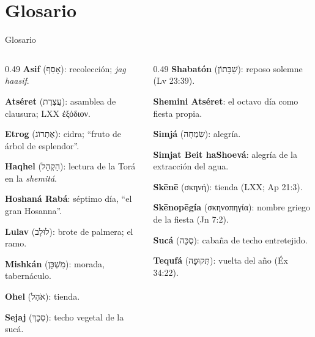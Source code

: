 \documentclass[hyperref={bookmarks=false},aspectratio=169]{beamer}
\newcommand{\heb}[1]{\mbox{\foreignlanguage{hebrew}{#1}}}
\newcommand{\grc}[1]{\foreignlanguage{ancientgreek}{#1}}
\begin{document}
\section{Glosario}

\begin{frame}{Glosario}
\begin{columns}[t,onlytextwidth]
\begin{column}{0.49\textwidth}\scriptsize
\textbf{Asif} (\heb{אָסִף}): recolección; \emph{jag haasif}.\par
\textbf{Atséret} (\heb{עֲצֶרֶת}): asamblea de clausura; LXX \grc{ἐξόδιον}.\par
\textbf{Etrog} (\heb{אֶתְרוֹג}): cidra; ``fruto de árbol de esplendor''.\par
\textbf{Haqhel} (\heb{הַקְהֵל}): lectura de la Torá en la \emph{shemitá}.\par
\textbf{Hoshaná Rabá}: séptimo día, ``el gran Hosanna''.\par
\textbf{Lulav} (\heb{לוּלָב}): brote de palmera; el ramo.\par
\textbf{Mishkán} (\heb{מִשְׁכָּן}): morada, tabernáculo.\par
\textbf{Ohel} (\heb{אֹהֶל}): tienda.\par
\textbf{Sejaj} (\heb{סְכָךְ}): techo vegetal de la sucá.
\end{column}
\begin{column}{0.49\textwidth}\scriptsize
\textbf{Shabatón} (\heb{שַׁבָּתוֹן}): reposo solemne (Lv 23:39).\par
\textbf{Shemini Atséret}: el octavo día como fiesta propia.\par
\textbf{Simjá} (\heb{שִׂמְחָה}): alegría.\par
\textbf{Simjat Beit haShoevá}: alegría de la extracción del agua.\par
\textbf{Skēnē} (\grc{σκηνή}): tienda (LXX; Ap 21:3).\par
\textbf{Skēnopēgía} (\grc{σκηνοπηγία}): nombre griego de la fiesta (Jn 7:2).\par
\textbf{Sucá} (\heb{סֻכָּה}): cabaña de techo entretejido.\par
\textbf{Tequfá} (\heb{תְּקוּפָה}): vuelta del año (Éx 34:22).
\end{column}
\end{columns}
\end{frame}

\end{document}
